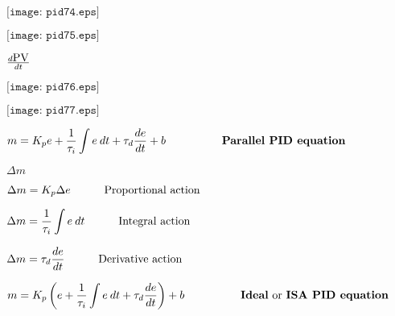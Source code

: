 \documentclass[12pt,a4paper,margin=2cm]{book}
\def\lthtmlcheckvsize{\ifdim\ht\sizebox<\vsize 
  \ifdim\wd\sizebox<\hsize\expandafter\hfill\fi \expandafter\vfill
  \else\expandafter\vss\fi}%
\begin{document}
{\newpage\clearpage
{}%
$\displaystyle \texttt{[image: pid74.eps]}$%
\lthtmlindisplaymathZ
\lthtmlcheckvsize\clearpage}

{\newpage\clearpage
{}%
$\displaystyle \texttt{[image: pid75.eps]}$%
\lthtmlindisplaymathZ
\lthtmlcheckvsize\clearpage}

{\newpage\clearpage
{}%
$ d\hbox{PV} \over dt$%
\lthtmlindisplaymathZ
\lthtmlcheckvsize\clearpage}

{\newpage\clearpage
{}%
$\displaystyle \texttt{[image: pid76.eps]}$%
\lthtmlindisplaymathZ
\lthtmlcheckvsize\clearpage}

{\newpage\clearpage
{}%
$\displaystyle \texttt{[image: pid77.eps]}$%
\lthtmlindisplaymathZ
\lthtmlcheckvsize\clearpage}

{\newpage\clearpage
{}%
$\displaystyle m = K_p e + {1 \over \tau_i} \int e \> dt + \tau_d {de \over dt} + b \hbox{\hskip 50pt \textbf{Parallel PID equation}}$%
\lthtmlindisplaymathZ
\lthtmlcheckvsize\clearpage}

{\newpage\clearpage
{}%
$ \Delta m$%
\lthtmlindisplaymathZ
\lthtmlcheckvsize\clearpage}

{\newpage\clearpage
{}%
$\displaystyle \Delta m = K_p \Delta e \hskip 30pt \hbox{Proportional action}$%
\lthtmlindisplaymathZ
\lthtmlcheckvsize\clearpage}

{\newpage\clearpage
{}%
$\displaystyle \Delta m = {1 \over \tau_i} \int e \> dt \hskip 30pt \hbox{Integral action}$%
\lthtmlindisplaymathZ
\lthtmlcheckvsize\clearpage}

{\newpage\clearpage
{}%
$\displaystyle \Delta m = \tau_d {de \over dt} \hskip 30pt \hbox{Derivative action}$%
\lthtmlindisplaymathZ
\lthtmlcheckvsize\clearpage}

{\newpage\clearpage
{}%
$\displaystyle m = K_p \left( e + {1 \over \tau_i} \int e \> dt + \tau_d {de \over dt} \right) + b \hbox{\hskip 50pt \textbf{Ideal} or \textbf{ISA PID equation}}$%
\lthtmlindisplaymathZ
\lthtmlcheckvsize\clearpage}
\end{document}
